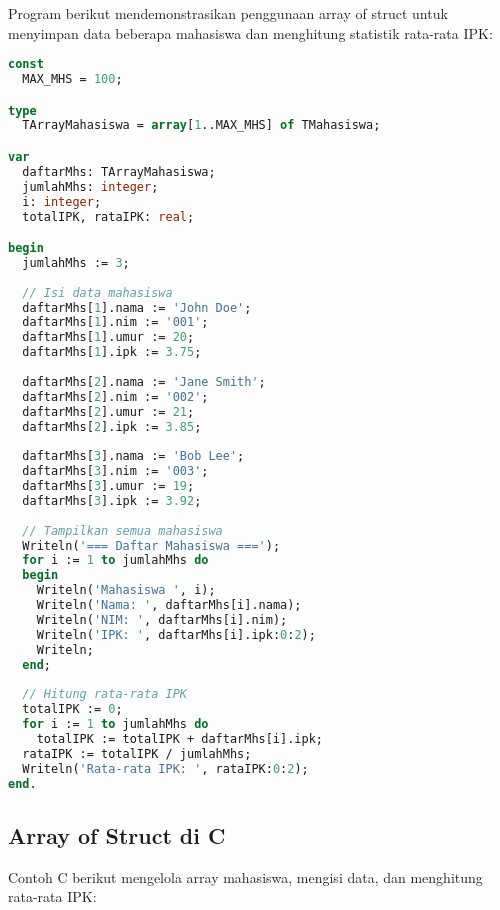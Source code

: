 \documentclass[../main.tex]{subfiles}
\begin{document}
Program berikut mendemonstrasikan penggunaan array of struct untuk menyimpan data beberapa mahasiswa dan menghitung statistik rata-rata IPK:

\begin{lstlisting}[language=Pascal, caption={Array of struct di Pascal}]
const
  MAX_MHS = 100;

type
  TArrayMahasiswa = array[1..MAX_MHS] of TMahasiswa;

var
  daftarMhs: TArrayMahasiswa;
  jumlahMhs: integer;
  i: integer;
  totalIPK, rataIPK: real;

begin
  jumlahMhs := 3;
  
  // Isi data mahasiswa
  daftarMhs[1].nama := 'John Doe';
  daftarMhs[1].nim := '001';
  daftarMhs[1].umur := 20;
  daftarMhs[1].ipk := 3.75;
  
  daftarMhs[2].nama := 'Jane Smith';
  daftarMhs[2].nim := '002';
  daftarMhs[2].umur := 21;
  daftarMhs[2].ipk := 3.85;
  
  daftarMhs[3].nama := 'Bob Lee';
  daftarMhs[3].nim := '003';
  daftarMhs[3].umur := 19;
  daftarMhs[3].ipk := 3.92;
  
  // Tampilkan semua mahasiswa
  Writeln('=== Daftar Mahasiswa ===');
  for i := 1 to jumlahMhs do
  begin
    Writeln('Mahasiswa ', i);
    Writeln('Nama: ', daftarMhs[i].nama);
    Writeln('NIM: ', daftarMhs[i].nim);
    Writeln('IPK: ', daftarMhs[i].ipk:0:2);
    Writeln;
  end;
  
  // Hitung rata-rata IPK
  totalIPK := 0;
  for i := 1 to jumlahMhs do
    totalIPK := totalIPK + daftarMhs[i].ipk;
  rataIPK := totalIPK / jumlahMhs;
  Writeln('Rata-rata IPK: ', rataIPK:0:2);
end.
\end{lstlisting}

\subsection{Array of Struct di C}

Contoh C berikut mengelola array mahasiswa, mengisi data, dan menghitung rata-rata IPK:
\end{document}
